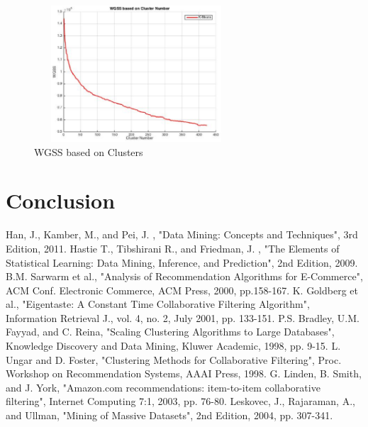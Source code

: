\documentclass{sig-alternate-05-2015}
\begin{document}
\begin{figure}
\centering
\includegraphics[height=2in,width=3in]{K_Means}
\caption{WGSS based on Clusters}
\label{fig:k means}
\end{figure}

\section{Conclusion}

\medskip

\begin{thebibliography}{9}
 Han, J., Kamber, M., and Pei, J. , "Data Mining: Concepts and Techniques", 3rd Edition, 2011.
 Hastie T., Tibshirani R., and Friedman, J. , "The Elements of Statistical Learning: Data Mining, Inference, and Prediction", 2nd Edition, 2009.
 B.M. Sarwarm et al., "Analysis of Recommendation Algorithms for E-Commerce", ACM Conf. Electronic Commerce, ACM Press, 2000, pp.158-167.
 K. Goldberg et al., "Eigentaste: A Constant Time Collaborative Filtering Algorithm", Information Retrieval J., vol. 4, no. 2, July 2001, pp. 133-151.
 P.S. Bradley, U.M. Fayyad, and C. Reina, "Scaling Clustering Algorithms to Large Databases", Knowledge Discovery and Data Mining, Kluwer Academic, 1998, pp. 9-15.
 L. Ungar and D. Foster, "Clustering Methods for Collaborative Filtering", Proc. Workshop on Recommendation Systems, AAAI Press, 1998.
 G. Linden, B. Smith, and J. York, "Amazon.com recommendations: item-to-item collaborative filtering", Internet Computing 7:1, 2003, pp. 76-80.
 Leskovec, J., Rajaraman, A., and Ullman, "Mining of Massive Datasets", 2nd Edition, 2004, pp. 307-341.

\end{thebibliography}
\end{document}
